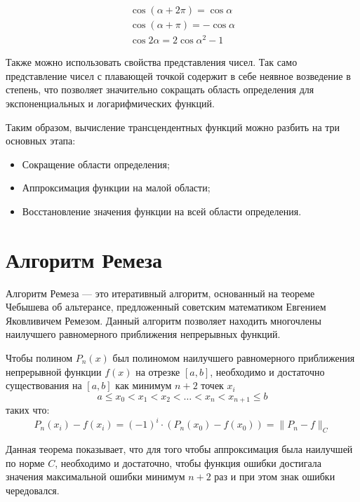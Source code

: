 \begin{align*}
    \cos{(\alpha + 2\pi)} = \cos{\alpha} \\
    \cos{(\alpha + \pi)} = -\cos{\alpha} \\
    \cos{2\alpha} = 2 \cos{\alpha}^{2} - 1
\end{align*}

Также можно использовать свойства представления чисел.
Так само представление чисел с плавающей точкой содержит в себе неявное возведение в степень, что позволяет значительно сокращать область определения для экспоненциальных и логарифмических функций.

Таким образом, вычисление трансцендентных функций можно разбить на три основных этапа\cite[с.~173]{muller}:

\begin{itemize}
    \item Сокращение области определения;
    \item Аппроксимация функции на малой области;
    \item Восстановление значения функции на всей области определения.
\end{itemize}

\section{Алгоритм Ремеза}

Алгоритм Ремеза --- это итеративный алгоритм, основанный на теореме Чебышева об альтерансе, предложенный советским математиком Евгением Яковливичем Ремезом.
Данный алгоритм позволяет находить многочлены наилучшего равномерного приближения непрерывных функций.

\begin{theorem}
Чтобы полином $P_{n}(x)$ был полиномом наилучшего равномерного приближения непрерывной функции $f(x)$ на отрезке $[a, b]$, необходимо и достаточно существования на $[a, b]$ как минимум $n+2$ точек $x_{i}$
\begin{equation}
    \label{remez:cheb:dots_prop}
    a \leq x_{0} < x_{1} < x_{2} < \ldots < x_{n} < x_{n+1} \leq b
\end{equation}
таких что:
\begin{equation}
    P_{n}(x_{i}) - f(x_{i}) = (-1)^{i} \cdot (P_{n}(x_{0}) - f(x_{0})) = \| P_{n} - f \|_{C}
\end{equation}
\end{theorem}

Данная теорема показывает, что для того чтобы аппроксимация была наилучшей по норме $C$, необходимо и достаточно, чтобы функция ошибки достигала значения максимальной ошибки минимум $n+2$ раз и при этом знак ошибки чередовался.


